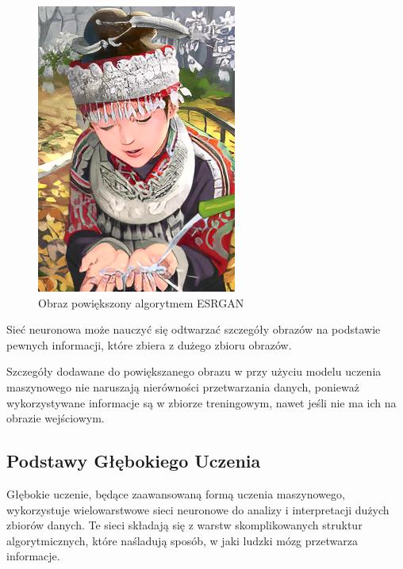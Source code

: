 \begin{figure}[ht]
\begin{minipage}[t]{0.3\linewidth}
        \includegraphics[width=\linewidth]{Rozdziały/02.Podstawy_teoretyczne/Obrazy/comic_ESRGAN_x4.png}
        \caption{Obraz powiększony algorytmem ESRGAN}
        \label{fig:image13}
    \end{minipage}
\end{figure}

Sieć neuronowa może nauczyć się odtwarzać szczegóły obrazów na podstawie pewnych informacji, które zbiera z dużego zbioru obrazów. 

Szczegóły dodawane do powiększanego obrazu w przy użyciu modelu uczenia maszynowego nie naruszają nierówności przetwarzania danych, ponieważ wykorzystywane informacje są w zbiorze treningowym, nawet jeśli nie ma ich na obrazie wejściowym.


\subsection*{Podstawy Głębokiego Uczenia}
Głębokie uczenie, będące zaawansowaną formą uczenia maszynowego, wykorzystuje wielowarstwowe sieci neuronowe do analizy i interpretacji dużych zbiorów danych. Te sieci składają się z warstw skomplikowanych struktur algorytmicznych, które naśladują sposób, w jaki ludzki mózg przetwarza informacje.


